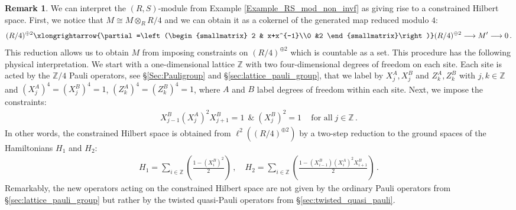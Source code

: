 \documentclass[sn-mathphys-num]{sn-jnl}
\theoremstyle{definition}
\newtheorem{remark}[lemma]{Remark}
\numberwithin{equation}{section}
\theoremstyle{definition}
\def\pd{\partial}
\def\IZ{{\mathbb{Z}}}
\begin{document}
\begin{remark}\label{phys_ex}
We can interpret the $(R,S)$-module from Example \ref{Example_RS_mod_non_invf} as giving rise to a constrained Hilbert space. First, we notice that $M\cong M\otimes_R R/4$ and we can obtain it as a cokernel of the generated map reduced modulo $4$:
\begin{align}
    (R/4)^{\oplus 2}\xlongrightarrow{\pd=\left(\begin{smallmatrix}
        2 & x+x^{-1}\\0 &2
    \end{smallmatrix}\right)} (R/4)^{\oplus 2}\longrightarrow M'\longrightarrow 0 \,.
\end{align}
 This reduction allows us to obtain $M$ from imposing constraints on $(R/4)^{\oplus 2}$ which is countable as a set. This procedure has the following physical interpretation. We start with a one-dimensional lattice $\IZ$ with two four-dimensional degrees of freedom on each site. Each site is acted by the $\IZ/4$ Pauli operators, see \S \ref{Sec:Pauligroup} and \S \ref{sec:lattice_pauli_group}, that we label by $X_j^A, X_j^B$ and $Z_k^A, Z_k^B$ with $j,k\in \IZ$ and $(X_j^A)^4=(X_j^B)^4=1$, $(Z_k^A)^4=(Z_k^B)^4=1$, where $A$ and $B$ label degrees of freedom within each site. Next, we impose the constraints: 
\begin{align}\label{eq:constraint}
    X_{j-1}^B(X_{j}^A)^2X_{j+1}^B=1\,\;\&\; (X_j^B)^2=1\,\quad  \mbox{for all}\; j\in \IZ\,.
\end{align}
In other words, the constrained Hilbert space is obtained from $\ell^2((R/4)^{\oplus 2})$ by a two-step reduction to the ground spaces of the Hamiltonians $H_1$ and $H_2$: 
\begin{align}
    H_1=\sum_{i\in \IZ}\left(\frac{1-(X^B_i)^2}{2}\right)\,,\quad H_2=\sum_{i\in \IZ}\left(\frac{1-(X^B_{i-1})(X_i^A)^2X_{i+1}^B}{2}\right)\,.
\end{align}
    Remarkably, the new operators acting on the constrained Hilbert space are not given by the ordinary Pauli operators from \S \ref{sec:lattice_pauli_group} but rather by the twisted quasi-Pauli operators from \S \ref{sec:twisted_quasi_pauli}.
    \end{remark}
\vspace{3mm} 
\end{document}
